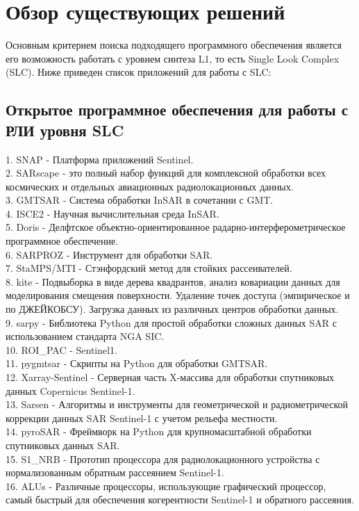 \chapter{Обзор существующих решений}
\label{sec:Chapter2} 

Основным критерием поиска подходящего программного обеспечения является его возможность работать с уровнем синтеза  L1, то есть Single Look Complex (SLC). Ниже приведен список приложений для работы с SLC:\\

\section{Открытое программное обеспечения для работы с РЛИ уровня SLC}

1. SNAP - Платформа приложений Sentinel.\\
2. SARscape - это полный набор функций для комплексной обработки всех космических и отдельных авиационных радиолокационных данных.\\
3. GMTSAR - Система обработки InSAR в сочетании с GMT.\\
4. ISCE2 - Научная вычислительная среда InSAR.\\
5. Doris - Делфтское объектно-ориентированное радарно-интерферометрическое программное обеспечение.\\
6. SARPROZ - Инструмент для обработки SAR.\\
7. StaMPS/MTI - Стэнфордский метод для стойких рассеивателей.\\
8. kite - Подвыборка в виде дерева квадрантов, анализ ковариации данных для моделирования смещения поверхности. Удаление точек доступа (эмпирическое и по ДЖЕЙКОБСУ). Загрузка данных из различных центров обработки данных.\\
9. sarpy - Библиотека Python для простой обработки сложных данных SAR с использованием стандарта NGA SIC.\\
10. ROI\_PAC - Sentinel1.\\
11. pygmtsar - Скрипты на Python для обработки GMTSAR.\\
12. Xarray-Sentinel - Серверная часть X-массива для обработки спутниковых данных Copernicus Sentinel-1.\\
13. Sarsen - Алгоритмы и инструменты для геометрической и радиометрической коррекции данных SAR Sentinel-1 с учетом рельефа местности.\\
14. pyroSAR - Фреймворк на Python для крупномасштабной обработки спутниковых данных SAR.\\
15. S1\_NRB - Прототип процессора для радиолокационного устройства с нормализованным обратным рассеянием Sentinel-1.\\
16. ALUs - Различные процессоры, использующие графический процессор, самый быстрый для обеспечения когерентности Sentinel-1 и обратного рассеяния.\\


